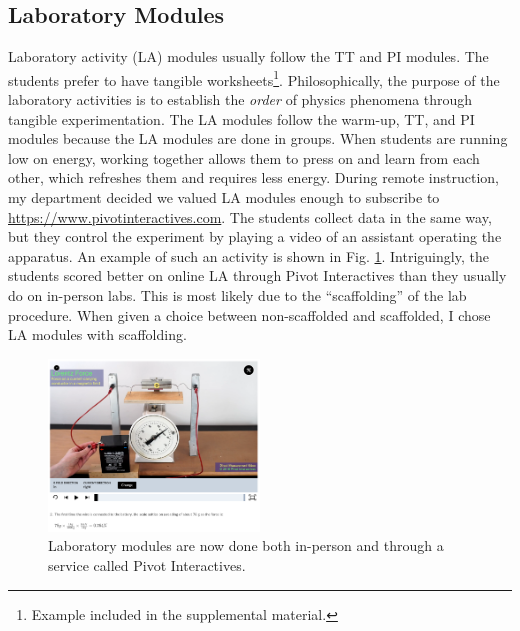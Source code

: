 \documentclass[../../../main.tex]{subfiles}
\begin{document}
\subsection{Laboratory Modules}
\label{sec:la}

Laboratory activity (LA) modules usually follow the TT and PI modules.  The students prefer to have tangible worksheets\footnote{Example included in the supplemental material.}.  Philosophically, the purpose of the laboratory activities is to establish the \textit{order} of physics phenomena through tangible experimentation.  The LA modules follow the warm-up, TT, and PI modules because the LA modules are done in groups.  When students are running low on energy, working together allows them to press on and learn from each other, which refreshes them and requires less energy.  During remote instruction, my department decided we valued LA modules enough to subscribe to \url{https://www.pivotinteractives.com}.  The students collect data in the same way, but they control the experiment by playing a video of an assistant operating the apparatus.  An example of such an activity is shown in Fig. \ref{fig:pivot}.  Intriguingly, the students scored better on online LA through Pivot Interactives than they usually do on in-person labs.  This is most likely due to the ``scaffolding'' of the lab procedure.  When given a choice between non-scaffolded and scaffolded, I chose LA modules with scaffolding.

\begin{figure}
\centering
\includegraphics[width=0.5\textwidth]{figures/pivot.png}
\caption{\label{fig:pivot}  Laboratory modules are now done both in-person and through a service called Pivot Interactives.}
\end{figure}
\end{document}
